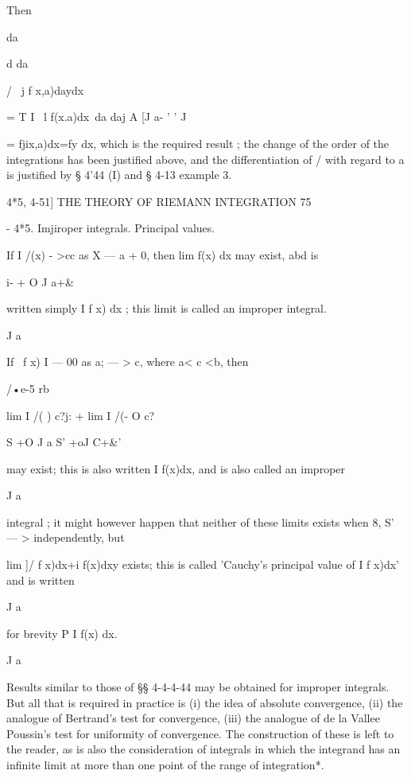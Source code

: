 Then



da



d da



/ \ j f x,a)daydx\

= T I \ l f(x.a)dx\ da daj A [J a- ' ' J

= fjix,a)dx=fy dx, which is the required result ; the change of the
order of the integrations has been justified above, and the
differentiation of / with regard to a is justified by § 4'44 (I) and §
4-13 example 3.



4*5, 4-51] THE THEORY OF RIEMANN INTEGRATION 75

- 4*5. Imjiroper integrals. Principal values.

If I /(x) - >cc as X — a + 0, then lim f(x) dx may exist, abd is

i- + O J a+\&

written simply I f x) dx ; this limit is called an improper integral.

J a

If \ f x) I — 00 as a; — > c, where a< c <b, then

/•e-5 rb

lim I /( ) c?j: + lim I /(- O c?

S +O J a S' +oJ C+\&'

may exist; this is also written I f(x)dx, and is also called an
improper

J a

integral ; it might however happen that neither of these limits exists
when 8, S' — > independently, but

lim ]/ f x)dx+i f(x)dxy exists; this is called 'Cauchy's principal
value of I f x)dx' and is written

J a

for brevity P I f(x) dx.

J a

Results similar to those of §§ 4-4-4-44 may be obtained for improper
integrals. But all that is required in practice is (i) the idea of
absolute convergence, (ii) the analogue of Bertrand's test for
convergence, (iii) the analogue of de la Vallee Poussin's test for
uniformity of convergence. The construction of these is left to the
reader, as is also the consideration of integrals in which the
integrand has an infinite limit at more than one point of the range of
integration*.



